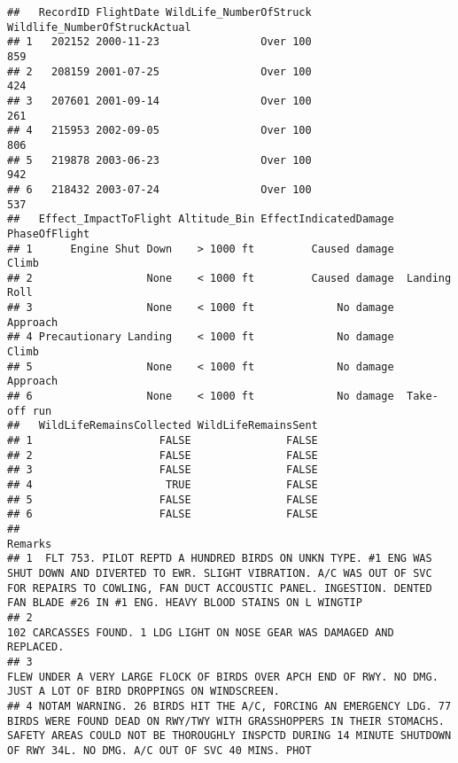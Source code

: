 \documentclass[
]{article}
\begin{document}
\begin{verbatim}
##   RecordID FlightDate WildLife_NumberOfStruck Wildlife_NumberOfStruckActual
## 1   202152 2000-11-23                Over 100                           859
## 2   208159 2001-07-25                Over 100                           424
## 3   207601 2001-09-14                Over 100                           261
## 4   215953 2002-09-05                Over 100                           806
## 5   219878 2003-06-23                Over 100                           942
## 6   218432 2003-07-24                Over 100                           537
##   Effect_ImpactToFlight Altitude_Bin EffectIndicatedDamage PhaseOfFlight
## 1      Engine Shut Down    > 1000 ft         Caused damage         Climb
## 2                  None    < 1000 ft         Caused damage  Landing Roll
## 3                  None    < 1000 ft             No damage      Approach
## 4 Precautionary Landing    < 1000 ft             No damage         Climb
## 5                  None    < 1000 ft             No damage      Approach
## 6                  None    < 1000 ft             No damage  Take-off run
##   WildLifeRemainsCollected WildLifeRemainsSent
## 1                    FALSE               FALSE
## 2                    FALSE               FALSE
## 3                    FALSE               FALSE
## 4                     TRUE               FALSE
## 5                    FALSE               FALSE
## 6                    FALSE               FALSE
##                                                                                                                                                                                                                                                           Remarks
## 1  FLT 753. PILOT REPTD A HUNDRED BIRDS ON UNKN TYPE. #1 ENG WAS SHUT DOWN AND DIVERTED TO EWR. SLIGHT VIBRATION. A/C WAS OUT OF SVC FOR REPAIRS TO COWLING, FAN DUCT ACCOUSTIC PANEL. INGESTION. DENTED FAN BLADE #26 IN #1 ENG. HEAVY BLOOD STAINS ON L WINGTIP
## 2                                                                                                                                                                                         102 CARCASSES FOUND. 1 LDG LIGHT ON NOSE GEAR WAS DAMAGED AND REPLACED.
## 3                                                                                                                                                FLEW UNDER A VERY LARGE FLOCK OF BIRDS OVER APCH END OF RWY. NO DMG. JUST A LOT OF BIRD DROPPINGS ON WINDSCREEN.
## 4 NOTAM WARNING. 26 BIRDS HIT THE A/C, FORCING AN EMERGENCY LDG. 77 BIRDS WERE FOUND DEAD ON RWY/TWY WITH GRASSHOPPERS IN THEIR STOMACHS. SAFETY AREAS COULD NOT BE THOROUGHLY INSPCTD DURING 14 MINUTE SHUTDOWN OF RWY 34L. NO DMG. A/C OUT OF SVC 40 MINS. PHOT

\end{verbatim}
\end{document}
